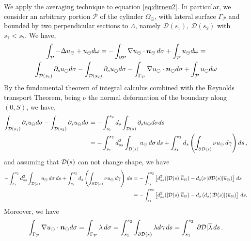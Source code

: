\documentclass[r]{siamart171218}
\begin{document}
We apply the averaging technique to equation \eqref{eq:dirneu2}. In particular, we consider an arbitrary portion $\mathcal{P}$ of the cylinder $\Omega_\ominus$, with lateral surface $\Gamma _{\mathcal{P}}$ and bounded by two perpendicular sections to $\Lambda$, namely $\mathcal{D}(s_1), \ \mathcal{D}(s_2)$ with $s_1<s_2$. We have,
\begin{multline*}
\int_{\mathcal{P}} -\Delta u_{\ominus} + u_{\ominus} d\omega =
-\int_{\partial \mathcal{P}} \nabla u_{\ominus} \cdot \boldsymbol n_{\ominus} \, d\sigma  + \int_{\mathcal{P}}u_{\ominus} d\omega=
\\
 \int_{\mathcal{D}(s_1)} \partial_s u_{\ominus} d\sigma -  \int_{\mathcal{D}(s_2)} \partial_s u_{\ominus} d\sigma -  \int_{\Gamma_{\mathcal{P}}} \nabla u_{\ominus} \cdot \boldsymbol n_{\ominus} d\sigma +\int_{\mathcal{P}}u_{\ominus} d\omega
\end{multline*}
By the fundamental theorem of integral calculus combined with the Reynolds transport Theorem, 
being $\nu$ the normal deformation of the boundary along $(0,S)$, we have,
\begin{equation*}
\begin{split}
\int_{\mathcal{D}(s_1)} \partial_s u_{\ominus} d\sigma -  \int_{\mathcal{D}(s_2)} \partial_s u_{\ominus} d\sigma 
&= -\int_{s_1}^{s_2} d_s \int_{\mathcal{D}(s)}  \partial_s u_{\ominus} d\sigma ds
\\
&= -\int_{s_1}^{s_2} d_{ss}^2 \int_{\mathcal{D}(s)} u_{\ominus} \, d\sigma \, ds +  \int_{s_1}^{s_2} d_s \left( \int_{\partial\mathcal{D}(s)} \nu u_{\ominus} \, d\gamma \right) ds\,,
\end{split}
\end{equation*}
and assuming that $\mathcal{D}(s)$  can not change shape, we have
\begin{equation*}
\begin{split}
-\int_{s_1}^{s_2} d_{ss}^2 \int_{\mathcal{D}(s)} u_{\ominus} \, d\sigma \, ds + \int_{s_1}^{s_2} d_s \left( \int_{\partial\mathcal{D}(s)} \nu u_{\ominus} \, d\gamma \right)\, ds
&=-\int_{s_1}^{s_2} \left[d_{ss}^2 (|\mathcal{D}(s)|\overline{\overline{u}}_{\ominus}) -  d_s(  \nu |\partial\mathcal{D}(s)| \overline{u}_{\ominus} ) \right] \, ds
\\
&=-\int_{s_1}^{s_2} \left[d_{ss}^2 (|\mathcal{D}(s)|\overline{\overline{u}}_{\ominus}) -  d_s\left(d_s(|\mathcal{D}(s)|) \overline{u}_{\ominus} \right) \right] \, ds.
\end{split}
\end{equation*}
Moreover, we have
\begin{equation*}
\int_{\Gamma_{\mathcal{P}}} \nabla u_{\ominus} \cdot \boldsymbol n_{\ominus} d\sigma =  \int_{\Gamma_{\mathcal{P}}} \lambda \, d\sigma
=  \int_{s_1}^{s_2} \int_{\partial\mathcal{D}(s)} \lambda d\gamma \, ds 
= \int_{s_1}^{s_2} |\partial\mathcal{D}| \overline{\lambda} \,ds\,.
\end{equation*}
\end{document}
